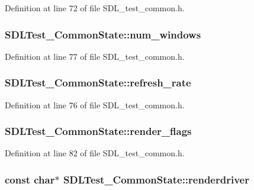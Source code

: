Definition at line 72 of file S\-D\-L\-\_\-test\-\_\-common.\-h.

\hypertarget{struct_s_d_l_test___common_state_a4f8020400392b1ae374c066b45a56538}{
\subsubsection[{num\-\_\-windows}]{ S\-D\-L\-Test\-\_\-\-Common\-State\-::num\-\_\-windows}}\label{struct_s_d_l_test___common_state_a4f8020400392b1ae374c066b45a56538}


Definition at line 77 of file S\-D\-L\-\_\-test\-\_\-common.\-h.

\hypertarget{struct_s_d_l_test___common_state_a7a2505f4f99be07db7bc76743ac6b5f9}{
\subsubsection[{refresh\-\_\-rate}]{ S\-D\-L\-Test\-\_\-\-Common\-State\-::refresh\-\_\-rate}}\label{struct_s_d_l_test___common_state_a7a2505f4f99be07db7bc76743ac6b5f9}


Definition at line 76 of file S\-D\-L\-\_\-test\-\_\-common.\-h.

\hypertarget{struct_s_d_l_test___common_state_a71e8797902cdb8f5c621ddcaf37d7e35}{
\subsubsection[{render\-\_\-flags}]{ S\-D\-L\-Test\-\_\-\-Common\-State\-::render\-\_\-flags}}\label{struct_s_d_l_test___common_state_a71e8797902cdb8f5c621ddcaf37d7e35}


Definition at line 82 of file S\-D\-L\-\_\-test\-\_\-common.\-h.

\hypertarget{struct_s_d_l_test___common_state_ad63f8a231467f2aad4494220b3bb3752}{
\subsubsection[{renderdriver}]{\setlength{\rightskip}{0pt plus 5cm}const char$\ast$ S\-D\-L\-Test\-\_\-\-Common\-State\-::renderdriver}}\label{struct_s_d_l_test___common_state_ad63f8a231467f2aad4494220b3bb3752}


